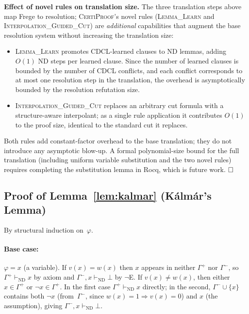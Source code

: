 \documentclass[acmtocl,review,anonymous]{acmart}
\newcommand{\proves}{\vdash}
\newcommand{\CP}{\textsc{CertiProof}}
\begin{document}
\medskip
\noindent\textbf{Effect of novel rules on translation size.}
The three translation steps above map Frege to resolution; \CP{}'s
novel rules (\textsc{Lemma\_Learn} and
\textsc{Interpolation\_Guided\_Cut}) are \emph{additional}
capabilities that augment the base resolution system without
increasing the translation size:
\begin{itemize}
  \item \textsc{Lemma\_Learn} promotes CDCL-learned clauses to
    ND lemmas, adding $O(1)$ ND steps per learned clause.  Since
    the number of learned clauses is bounded by the number of
    CDCL conflicts, and each conflict corresponds to at most one
    resolution step in the translation, the overhead is
    asymptotically bounded by the resolution refutation size.
  \item \textsc{Interpolation\_Guided\_Cut} replaces an arbitrary
    cut formula with a structure-aware interpolant; as a single
    rule application it contributes $O(1)$ to the proof size,
    identical to the standard cut it replaces.
\end{itemize}
Both rules add constant-factor overhead to the base translation;
they do not introduce any asymptotic blow-up.
A formal polynomial-size bound for the full translation (including
uniform variable substitution and the two novel rules) requires
completing the substitution lemma in Rocq, which is future work.
$\hfill\square$

\subsection{Proof of Lemma~\ref{lem:kalmar} (K\'{a}lm\'{a}r's Lemma)}

By structural induction on~$\varphi$.

\paragraph{Base case:} $\varphi = x$ (a variable).
If $v(x) = w(x)$ then $x$ appears in neither $\Gamma^+$ nor $\Gamma^-$,
so $\Gamma^+ \proves_{\mathrm{ND}} x$ by axiom and
$\Gamma^-, x \proves_{\mathrm{ND}} \bot$ by $\neg$E.
If $v(x) \neq w(x)$, then either $x \in \Gamma^+$ or
$\neg x \in \Gamma^+$.  In the first case $\Gamma^+ \proves_{\mathrm{ND}} x$
directly; in the second, $\Gamma^- \cup \{x\}$ contains both
$\neg x$ (from~$\Gamma^-$, since $w(x)=1 \Rightarrow v(x)=0$)
and $x$ (the assumption), giving $\Gamma^-, x \proves_{\mathrm{ND}} \bot$.
\end{document}
